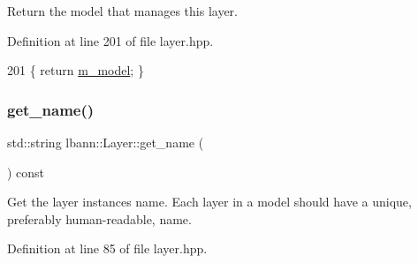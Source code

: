 Return the model that manages this layer. 

Definition at line 201 of file layer.\+hpp.


\begin{DoxyCode}
201 \{ \textcolor{keywordflow}{return} \hyperlink{classlbann_1_1Layer_a3d9315e99574166f2f33e37b572021d2}{m\_model}; \}
\end{DoxyCode}
\mbox{\label{classlbann_1_1Layer_a80027550202fa7dbb1dd55fa8a66c84b}} 
\subsubsection{\texorpdfstring{get\+\_\+name()}{get\_name()}}
{\footnotesize\ttfamily std\+::string lbann\+::\+Layer\+::get\+\_\+name (\begin{DoxyParamCaption}{ }\end{DoxyParamCaption}) const\hspace{0.3cm}{\ttfamily [inline]}}

Get the layer instance\textquotesingle{}s name. Each layer in a model should have a unique, preferably human-\/readable, name. 

Definition at line 85 of file layer.\+hpp.


